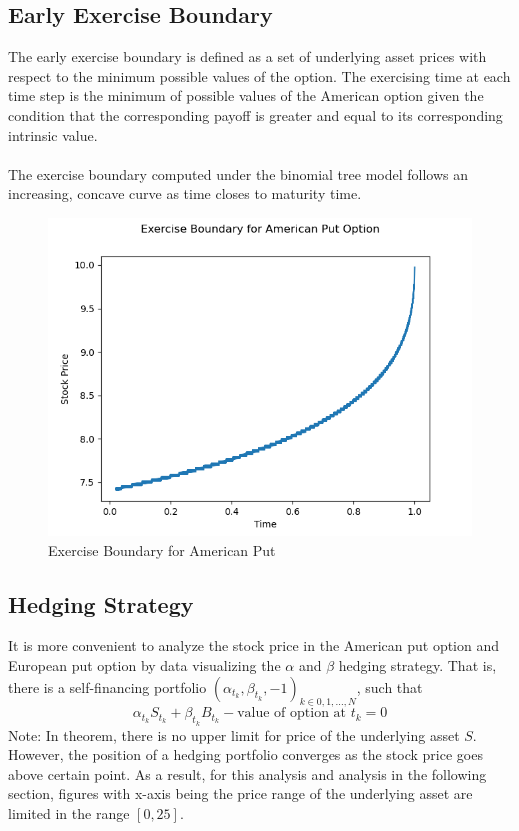 \documentclass[12pt]{article}
\begin{document}
\subsection{Early Exercise Boundary}
The early exercise boundary is defined as a set of underlying asset prices with respect to the minimum possible values of the option. 
The exercising time at each time step is the minimum of possible values of the American option given the condition that the corresponding 
payoff is greater and equal to its corresponding intrinsic value. 
\\\\
The exercise boundary computed under the binomial tree model follows an increasing, concave curve as time closes to maturity time.  \\
\begin{figure}[H]
  \centering
  \includegraphics[scale=0.5]{3a-i.png}
  \caption[Exercise Boundary for American Put]{Exercise Boundary for American Put}
\end{figure}


\subsection{Hedging Strategy}
It is more convenient to analyze the stock price in the American put option and European put option by data visualizing the $\alpha$ and 
$\beta$ hedging strategy. That is, there is a self-financing portfolio $(\alpha_{t_k}, \beta_{t_k}, -1)_{k\in 0,1,\ldots, N}$, such that
\[ \alpha_{t_k}S_{t_k} + \beta_{t_k}B_{t_k} - \text{value of option at }t_k=0\]
Note: In theorem, there is no upper limit for price of the underlying asset $S$. However, the position of a hedging portfolio
converges as the stock price goes above certain point. As a result, for this analysis and analysis in the following section, figures 
with x-axis being the price range of the underlying asset are limited in the range $[0,25]$.
\end{document}
